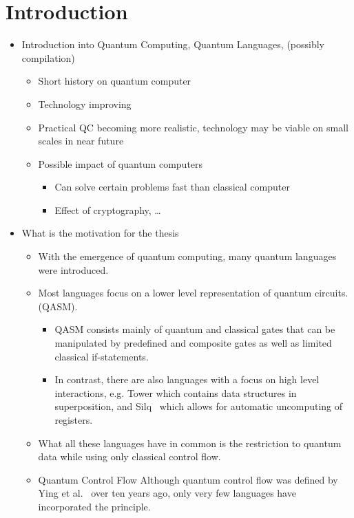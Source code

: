 \chapter{Introduction}
\label{ch:introduction}
\begin{itemize}
    \item Introduction into Quantum Computing, Quantum Languages, (possibly compilation)
    \begin{itemize}
        \item Short history on quantum computer
        \item Technology improving
        \item Practical QC becoming more realistic, technology may be viable on small scales in near future
        \item Possible impact of quantum computers
        \begin{itemize}
            \item Can solve certain problems fast than classical computer
            \item Effect of cryptography, \dots
        \end{itemize}
    \end{itemize}
    \item What is the motivation for the thesis
    \begin{itemize}
        \item With the emergence of quantum computing, many quantum languages were introduced. 
        \item Most languages focus on a lower level representation of quantum circuits. (QASM)\cite{CBSG17}.
        \begin{itemize}
            \item QASM consists mainly of quantum and classical gates that can be manipulated by predefined and composite gates as well as limited classical if-statements. 
            \item In contrast, there are also languages with a focus on high level interactions, e.g. Tower\cite{ChMi22} which contains data structures in superposition, and Silq~\cite{BBGV20} which allows for automatic uncomputing of registers.
        \end{itemize}
        \item  What all these languages have in common is the restriction to quantum data while using only classical control flow.
        \item Quantum Control Flow Although quantum control flow was defined by Ying et al.~\cite{YYF12} over ten years ago, only very few languages have incorporated the principle.

\end{itemize}
\end{itemize}
